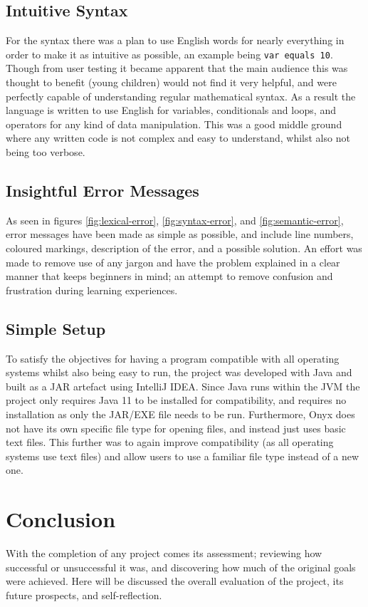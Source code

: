 \documentclass[
]{report}
\begin{document}
\section{Intuitive Syntax}
For the syntax there was a plan to use English words for nearly
everything in order to make it as intuitive as possible, an example
being \texttt{var\ equals\ 10}. Though from user testing it became
apparent that the main audience this was thought to benefit (young
children) would not find it very helpful, and were perfectly capable of
understanding regular mathematical syntax. As a result the language is
written to use English for variables, conditionals and loops, and
operators for any kind of data manipulation. This was a good middle
ground where any written code is not complex and easy to understand,
whilst also not being too verbose.

\section{Insightful Error Messages}
As seen in figures \ref{fig:lexical-error}, \ref{fig:syntax-error},
and \ref{fig:semantic-error}, error messages have been made
as simple as possible, and include line numbers, coloured markings, description
of the error, and a possible solution. An effort was made to remove use of any
jargon and have the problem explained in a clear manner that keeps beginners in mind;
an attempt to remove confusion and frustration during learning experiences.

\section{Simple Setup}
To satisfy the objectives for having a program compatible with all
operating systems whilst also being easy to run, the project was
developed with Java and built as a JAR artefact using IntelliJ IDEA.
Since Java runs within the JVM the project only requires Java 11 to be
installed for compatibility, and requires no installation as only the
JAR/EXE file needs to be run. Furthermore, Onyx does not have its own
specific file type for opening files, and instead just uses basic text
files. This further was to again improve compatibility (as all operating
systems use text files) and allow users to use a familiar file type
instead of a new one.

\chapter{Conclusion}
With the completion of any project comes its assessment; reviewing how
successful or unsuccessful it was, and discovering how much of the
original goals were achieved. Here will be discussed the overall
evaluation of the project, its future prospects, and self-reflection.
\end{document}
